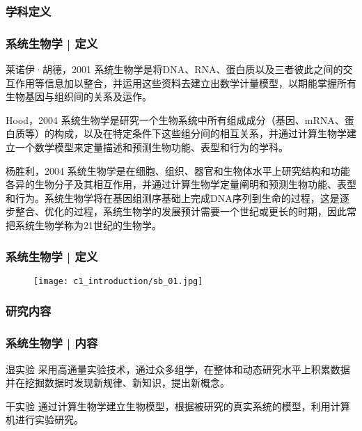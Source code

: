 \subsubsection{学科定义}
\begin{frame}
  \frametitle{系统生物学 | 定义}
  \begin{block}{莱诺伊·胡德，2001}
    系统生物学是将DNA、RNA、蛋白质以及三者彼此之间的交互作用等信息加以整合，并运用这些资料去建立出数学计量模型，以期能掌握所有生物基因与组织间的关系及运作。\\
  \end{block}
  \pause
  \begin{block}{Hood，2004}
系统生物学是研究一个生物系统中所有组成成分（基因、mRNA、蛋白质等）的构成，以及在特定条件下这些组分间的相互关系，并通过计算生物学建立一个数学模型来定量描述和预测生物功能、表型和行为的学科。
  \end{block}
  \pause
  \begin{block}{杨胜利，2004}
系统生物学是在细胞、组织、器官和生物体水平上研究结构和功能各异的生物分子及其相互作用，并通过计算生物学定量阐明和预测生物功能、表型和行为。系统生物学将在基因组测序基础上完成DNA序列到生命的过程，这是逐步整合、优化的过程，系统生物学的发展预计需要一个世纪或更长的时期，因此常把系统生物学称为21世纪的生物学。
  \end{block}
\end{frame}

\begin{frame}
  \frametitle{系统生物学 | 定义}
  \begin{figure}
    \centering
    \texttt{[image: c1\_introduction/sb\_01.jpg]}
  \end{figure}
\end{frame}

\subsubsection{研究内容}
\begin{frame}
  \frametitle{系统生物学 | 内容}
  \begin{block}{湿实验}
采用高通量实验技术，通过众多组学，在整体和动态研究水平上积累数据并在挖掘数据时发现新规律、新知识，提出新概念。
  \end{block}
  \pause
  \begin{block}{干实验}
通过计算生物学建立生物模型，根据被研究的真实系统的模型，利用计算机进行实验研究。
  \end{block}
\end{frame}

